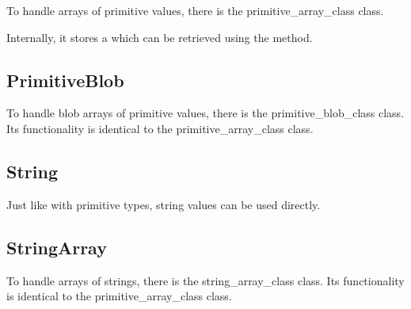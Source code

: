 To handle arrays of primitive values, there is the \gls{primitive_array_class} class.



Internally, it stores a  which can be retrieved using the  method.



\subsection{PrimitiveBlob}
\label{section:member_types:primitive_blob}

To handle blob arrays of primitive values, there is the \gls{primitive_blob_class} class. Its functionality is identical to the \gls{primitive_array_class} class.





\subsection{String}
\label{section:member_types:string}

Just like with primitive types, string values can be used directly.





\subsection{StringArray}
\label{section:member_types:string_array}

To handle arrays of strings, there is the \gls{string_array_class} class. Its functionality is identical to the \gls{primitive_array_class} class.





